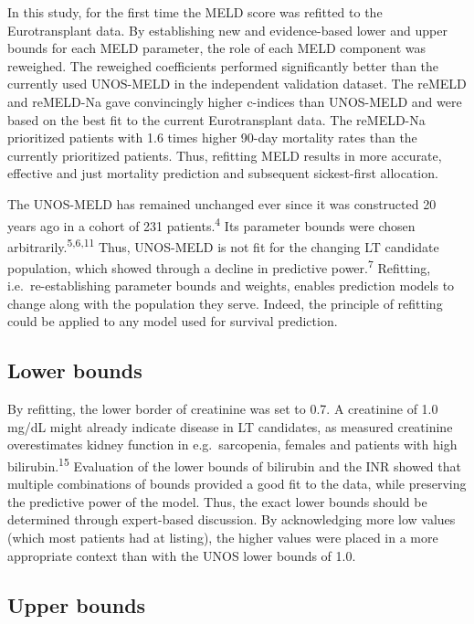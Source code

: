 \documentclass[11pt,english,]{book} %
\begin{document}
In this study, for the first time the MELD score was refitted to the Eurotransplant data. By establishing new and evidence-based lower and upper bounds for each MELD parameter, the role of each MELD component was reweighed. The reweighed coefficients performed significantly better than the currently used UNOS-MELD in the independent validation dataset. The reMELD and reMELD-Na gave convincingly higher c-indices than UNOS-MELD and were based on the best fit to the current Eurotransplant data. The reMELD-Na prioritized patients with 1.6 times higher 90-day mortality rates than the currently prioritized patients. Thus, refitting MELD results in more accurate, effective and just mortality prediction and subsequent sickest-first allocation.

The UNOS-MELD has remained unchanged ever since it was constructed 20 years ago in a cohort of 231 patients.\textsuperscript{4} Its parameter bounds were chosen arbitrarily.\textsuperscript{5,6,11} Thus, UNOS-MELD is not fit for the changing LT candidate population, which showed through a decline in predictive power.\textsuperscript{7} Refitting, i.e.~re-establishing parameter bounds and weights, enables prediction models to change along with the population they serve. Indeed, the principle of refitting could be applied to any model used for survival prediction.

\hypertarget{lower-bounds}{%
\subsection*{Lower bounds}\label{lower-bounds}}

By refitting, the lower border of creatinine was set to 0.7. A creatinine of 1.0 mg/dL might already indicate disease in LT candidates, as measured creatinine overestimates kidney function in e.g.~sarcopenia, females and patients with high bilirubin.\textsuperscript{15} Evaluation of the lower bounds of bilirubin and the INR showed that multiple combinations of bounds provided a good fit to the data, while preserving the predictive power of the model. Thus, the exact lower bounds should be determined through expert-based discussion. By acknowledging more low values (which most patients had at listing), the higher values were placed in a more appropriate context than with the UNOS lower bounds of 1.0.

\hypertarget{upper-bounds}{%
\subsection*{Upper bounds}\label{upper-bounds}}
\end{document}
